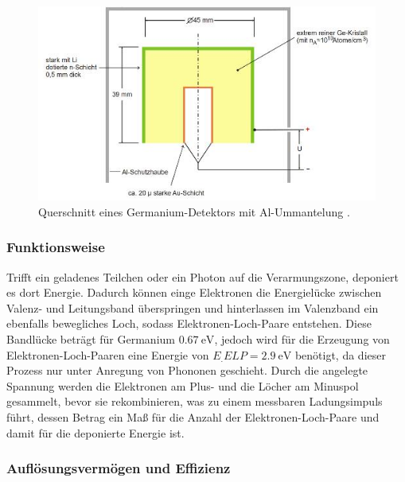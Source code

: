\begin{figure}
	\centering
	\includegraphics[width=\linewidth-70pt,height=\textheight-70pt,keepaspectratio]{content/images/Detektor.jpg}
	\caption{Querschnitt eines Germanium-Detektors mit Al-Ummantelung \cite{V18}.}
	\label{fig:Det}
\end{figure}

\subsubsection{Funktionsweise}

Trifft ein geladenes Teilchen oder ein Photon auf die Verarmungszone, deponiert es dort Energie. Dadurch können einge Elektronen die Energielücke zwischen Valenz- und Leitungsband überspringen und hinterlassen im Valenzband ein ebenfalls bewegliches Loch, sodass Elektronen-Loch-Paare entstehen. Diese Bandlücke beträgt für Germanium $\SI{0,67}{\electronvolt}$, jedoch wird für die Erzeugung von Elektronen-Loch-Paaren eine Energie von $E_.{ELP}=\SI{2,9}{\electronvolt}$\cite{V18} benötigt, da dieser Prozess nur unter Anregung von Phononen geschieht. Durch die angelegte Spannung werden die Elektronen am Plus- und die Löcher am Minuspol gesammelt, bevor sie rekombinieren, was zu einem messbaren Ladungsimpuls führt, dessen Betrag ein Maß für die Anzahl der Elektronen-Loch-Paare und damit für die deponierte Energie ist.

\subsubsection{Auflösungsvermögen und Effizienz}
\label{subsubsec:Effizienz}

